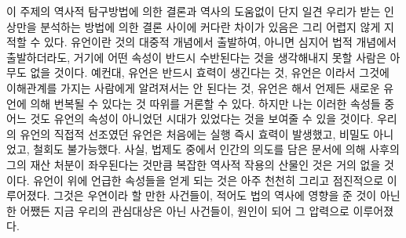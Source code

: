 이 주제의 역사적 탐구방법에 의한 결론과
역사의 도움없이 단지
일견 우리가 받는 인상만을 분석하는 방법에 의한
결론 사이에
커다란 차이가 있음은 그리 어렵지 않게 지적할 수 있다.
유언이란 것의 대중적 개념에서 출발하여,
아니면 심지어 법적 개념에서 출발하더라도,
거기에 어떤 속성이 반드시 수반된다는 것을 생각해내지 못할 사람은
아무도 없을 것이다.
예컨대, 유언은 반드시 
효력이 생긴다는 것, 유언은 이라서
그것에 이해관계를 가지는 사람에게 알려져서는 안 된다는 것,
유언은 해서
언제든 새로운 유언에 의해 번복될 수 있다는 것 따위를 거론할 수 있다.
하지만 나는 이러한 속성들 중 어느 것도 유언의 속성이 아니었던 시대가
있었다는 것을 보여줄 수 있을 것이다.
우리의 유언의 직접적 선조였던 유언은 처음에는
실행 즉시 효력이 발생했고, 비밀도 아니었고, 철회도 불가능했다.
사실,
법제도 중에서
인간의 의도를 담은 문서에 의해 사후의 그의 재산 처분이
좌우된다는 것만큼 복잡한 역사적 작용의 산물인 것은 거의 없을 것이다.
유언이
위에 언급한 속성들을 얻게 되는 것은
아주 천천히 그리고 점진적으로 이루어졌다.
그것은
우연이라 할 만한 사건들이,
적어도 법의 역사에 영향을 준 것이 아닌 한
어쨌든 지금 우리의 관심대상은 아닌 사건들이,
원인이 되어 그 압력으로 이루어졌다.

